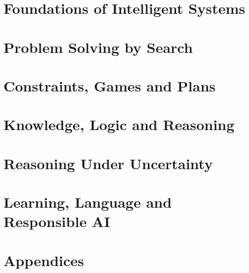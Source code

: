 \documentclass[11pt,a4paper,oneside]{report}
\begin{document}


\part{Foundations of Intelligent Systems}





\part{Problem Solving by Search}





\part{Constraints, Games and Plans}





\part{Knowledge, Logic and Reasoning}






\part{Reasoning Under Uncertainty}





\part{Learning, Language and Responsible AI}








\appendix
\part*{Appendices}







\end{document}
